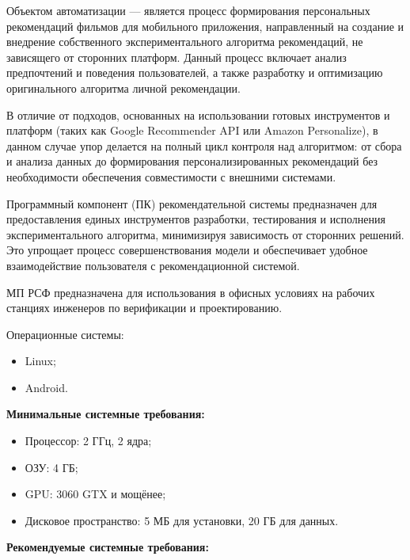 

Объектом автоматизации --- является процесс формирования персональных рекомендаций фильмов
для мобильного приложения, направленный на создание и внедрение собственного
экспериментального алгоритма рекомендаций, не зависящего от сторонних платформ.
Данный процесс включает анализ предпочтений и поведения пользователей, а также
разработку и оптимизацию оригинального алгоритма личной рекомендации.

В отличие от подходов, основанных на использовании готовых инструментов и платформ
(таких как Google Recommender API или Amazon Personalize), в данном случае упор делается
на полный цикл контроля над алгоритмом: от сбора и анализа данных до формирования
персонализированных рекомендаций без необходимости обеспечения совместимости
с внешними системами.

Программный компонент (ПК) рекомендательной системы предназначен для предоставления
единых инструментов разработки, тестирования и исполнения экспериментального алгоритма,
минимизируя зависимость от сторонних решений. Это упрощает процесс совершенствования модели
и обеспечивает удобное взаимодействие пользователя с рекомендационной системой.


МП РСФ предназначена для использования в офисных условиях
на рабочих станциях инженеров по верификации и проектированию.

Операционные системы:

\begin{itemize}
	\item Linux;
	\item Android.
\end{itemize}

\textbf{Минимальные системные требования:}

\begin{itemize}
	\item Процессор: 2 ГГц, 2 ядра;
	\item ОЗУ: 4 ГБ;
	\item GPU: 3060 GTX и мощёнее;
	\item Дисковое пространство: 5 МБ для установки, 20 ГБ для данных.
\end{itemize}

\textbf{Рекомендуемые системные требования:}

